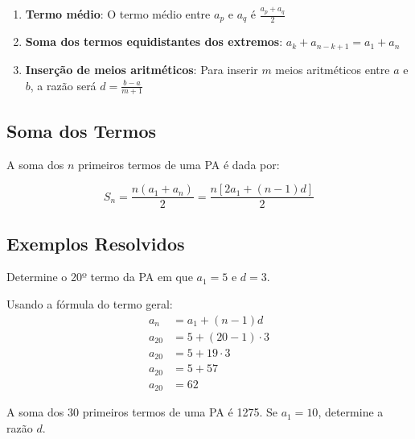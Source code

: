 \documentclass[12pt,a4paper]{article}
\begin{document}
\begin{enumerate}
    \item \textbf{Termo médio}: O termo médio entre $a_p$ e $a_q$ é $\frac{a_p + a_q}{2}$
    \item \textbf{Soma dos termos equidistantes dos extremos}: $a_k + a_{n-k+1} = a_1 + a_n$
    \item \textbf{Inserção de meios aritméticos}: Para inserir $m$ meios aritméticos entre $a$ e $b$, a razão será $d = \frac{b-a}{m+1}$
\end{enumerate}

\subsection{Soma dos Termos}

A soma dos $n$ primeiros termos de uma PA é dada por:

\begin{equation}
S_n = \frac{n(a_1 + a_n)}{2} = \frac{n[2a_1 + (n-1)d]}{2}
\end{equation}

\subsection{Exemplos Resolvidos}

\begin{tcolorbox}[colback=blue!5!white,colframe=blue!75!black,title=Exemplo 1]
Determine o 20º termo da PA em que $a_1 = 5$ e $d = 3$.
\end{tcolorbox}

\begin{tcolorbox}[colback=green!5!white,colframe=green!75!black,title=Resolução]
Usando a fórmula do termo geral:
\begin{align}
a_n &= a_1 + (n-1)d\\
a_{20} &= 5 + (20-1) \cdot 3\\
a_{20} &= 5 + 19 \cdot 3\\
a_{20} &= 5 + 57\\
a_{20} &= 62
\end{align}
\end{tcolorbox}

\begin{tcolorbox}[colback=blue!5!white,colframe=blue!75!black,title=Exemplo 2]
A soma dos 30 primeiros termos de uma PA é 1275. Se $a_1 = 10$, determine a razão $d$.
\end{tcolorbox}
\end{document}
